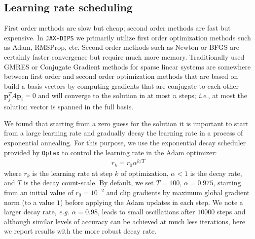 \documentclass{elsarticle}
\begin{document}
\subsection{Learning rate scheduling}
First order methods are slow but cheap; second order methods are fast but expensive. In \texttt{JAX-DIPS} we primarily utilize first order optimization methods such as Adam, RMSProp, etc. Second order methods such as Newton or BFGS are certainly faster convergence but require much more memory. Traditionally used GMRES or Conjugate Gradient methods for sparse linear systems are somewhere between first order and second order optimization methods that are based on build a basis vectors by computing gradients that are conjugate to each other $\mathbf{p}_j^T A \mathbf{p}_i=0$ and will converge to the solution in at most $n$ steps; \textit{i.e.}, at most the solution vector is spanned in the full basis.



We found that starting from a zero guess for the solution it is important to start from a large learning rate and gradually decay the learning rate in a process of exponential annealing. For this purpose, we use the exponential decay scheduler provided by \texttt{Optax} \cite{optax2020github} to control the learning rate in the Adam \cite{kingma2014adam} optimizer:
\begin{align*}
r_{k} = r_0 \alpha^{k / T}
\end{align*}
where $r_k$ is the learning rate at step $k$ of optimization, $\alpha<1$ is the decay rate, and $T$ is the decay count-scale. By default, we set $T=100$, $\alpha=0.975$, starting from an initial value of $r_0=10^{-2}$ and clip gradients by maximum global gradient norm (to a value $1$) \cite{gradClipping} before applying the Adam updates in each step. We note a larger decay rate, \textit{e.g.} $\alpha=0.98$, leads to small oscillations after $10000$ steps and although similar levels of accuracy can be achieved at much less iterations, here we report results with the more robust decay rate. %

\end{document}
